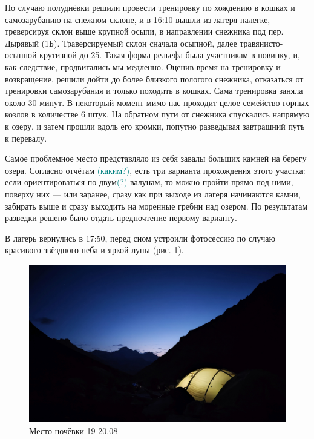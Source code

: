 По случаю полуднёвки решили провести тренировку по хождению в кошках и самозарубанию на снежном склоне, и в 16:10 вышли из лагеря налегке, треверсируя склон выше крупной осыпи, в направлении снежника под пер. Дырявый (1Б). Траверсируемый склон сначала осыпной, далее травянисто-осыпной крутизной до 25\degree. Такая форма рельефа была участникам в новинку, и, как следствие, продвигались мы медленно. Оценив время на тренировку и возвращение, решили дойти до более близкого пологого снежника, отказаться от тренировки самозарубания и только походить в кошках. Сама тренировка заняла около 30 минут. В некоторый момент мимо нас проходит целое семейство горных козлов в количестве 6 штук.
На обратном пути от снежника спускались напрямую к озеру, и затем прошли вдоль его кромки, попутно разведывая завтрашний путь к перевалу. 

Самое проблемное место представляло из себя завалы больших камней на берегу озера. Согласно отчётам \textcolor{teal}{(каким?)}, есть три варианта прохождения этого участка: если ориентироваться по двум\textcolor{teal}{(?)} валунам, то можно пройти прямо под ними, поверху них --- или заранее, сразу как при выходе из лагеря начинаются камни, забирать выше и сразу выходить на моренные гребни над озером. По результатам разведки решено было отдать предпочтение первому варианту.

В лагерь вернулись в 17:50, перед сном устроили фотосессию по случаю красивого звёздного неба и яркой луны (рис. \ref{fig:IMG_20240829_194851}).

\begin{figure}[h!]
	\centering
	\includegraphics[width=0.7\linewidth]{../pics/IMG_20240829_194851}
	\caption{Место ночёвки 19-20.08}
	\label{fig:IMG_20240829_194851}
\end{figure}

\clearpage